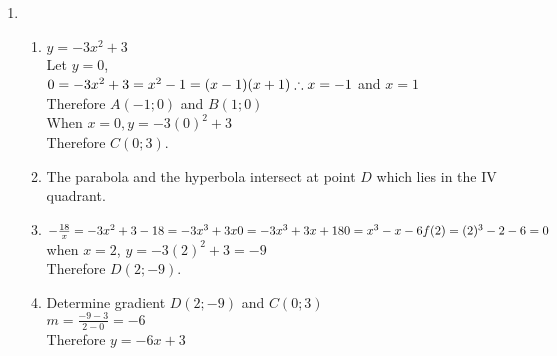 \begin{eocsolutions}{}
{\begin{enumerate}[itemsep=8pt, label=\textbf{\arabic*}. ]
\begin{enumerate}[noitemsep, label=\textbf{(\alph*)} ]
	  $AO^2=OD^2+AD^2\\
	  =(\sqrt{8})^2+(\sqrt{8})^2\\
	  =8+8\\
	  =16\\
	\therefore AO=4$ units\\
	Similarly, $OB=4$ units\\
	$\therefore AB=8$ units\\%
    \item Given that $G(-2;0)$, then $F(-2;-2)$ on the line $y=x$\\
	  Therefore length $EF = -2-(-4)=2$ units%
  \end{enumerate}

\item %
    \begin{enumerate}[noitemsep, label=\textbf{(\alph*)} ]
    \item $y=-3x^2+3$\\
    Let $y=0$, \\
    $0=-3x^2+3\\
      =x^2-1\\
      =(x-1)(x+1)\\
    \therefore x=-1$ and $x=1$\\
    Therefore $A(-1;0)$ and $B(1;0)$\\
    When $x=0, y=-3(0)^2+3$\\
    Therefore $C(0;3)$.\\
    \item The parabola and the hyperbola intersect at point $D$ which lies in the IV quadrant.%
    \item $-\frac{18}{x}=-3x^2+3\\
	  -18=-3x^3+3x\\
	  0=-3x^3+3x+18\\
	  0=x^3-x-6\\
	  f(2)=(2)^3-2-6=0$\\
	  when $x=2$, $y=-3(2)^2+3=-9$\\
	  Therefore $D(2;-9)$.%
    \item Determine gradient $D(2;-9)$ and $C(0;3)$\\
	  $m=\frac{-9-3}{2-0}=-6$\\
	  Therefore $y=-6x+3$%
  \end{enumerate}


\end{enumerate}}
\end{eocsolutions}

